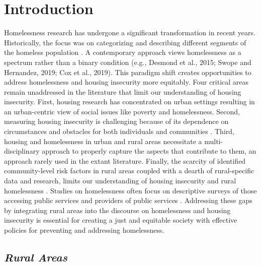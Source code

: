 \chapter{Introduction} 

Homelessness research has undergone a significant transformation in recent years. Historically, the focus was on categorizing and describing different segments of the homeless population \citep{lee_homelessness_2021}. A contemporary approach views homelessness as a spectrum rather than a binary condition (e.g., Desmond et al., 2015; Swope and Hernandez, 2019; Cox et al., 2019). This paradigm shift creates opportunities to address homelessness and housing insecurity more equitably. Four critical areas remain unaddressed in the literature that limit our understanding of housing insecurity. First, housing research has concentrated on urban settings resulting in an urban-centric view of social issues like poverty and homelessness. Second, measuring housing insecurity is challenging because of its dependence on circumstances and obstacles for both individuals and communities \citep{leifheit_building_2022}. Third, housing and homelessness in urban and rural areas necessitate a multi-disciplinary approach to properly capture the aspects that contribute to them, an approach rarely used in the extant literature.  Finally, the scarcity of identified community-level risk factors in rural areas coupled with a dearth of rural-specific data and research, limits our understanding of housing insecurity and rural homelessness \citep{gleason_using_2021}. Studies on homelessness often focus on descriptive surveys of those accessing public services and providers of public services \citep{robertson_rural_2007}. Addressing these gaps by integrating rural areas into the discourse on homelessness and housing insecurity is essential for creating a just and equitable society with effective policies for preventing and addressing homelessness\citep{oregan_how_2021}.

\section{\textit{Rural Areas}}

